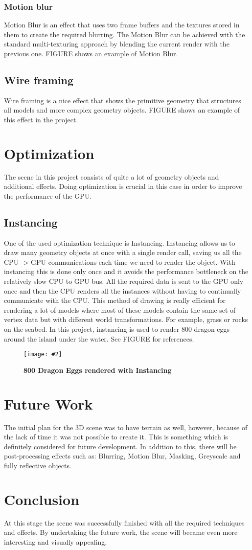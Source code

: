 \documentclass[10pt, a4paper]{article}
\newcommand{\figuremacro}[5]{
    \begin{figure}[#1]
        \centering
        \texttt{[image: \#2]}
        \caption[#3]{\textbf{#3}#4}
        \label{fig:#2}
    \end{figure}
}
\begin{document}
	\subsubsection{Motion blur}
	Motion Blur is an effect that uses two frame buffers and the textures stored in them to create the required blurring. The Motion Blur can be achieved with the standard multi-texturing approach by blending the current render with the previous one. FIGURE shows an example of Motion Blur.
	\subsection{Wire framing}
	Wire framing is a nice effect that shows the primitive geometry that structures all models and more complex geometry objects. FIGURE shows an example of this effect in the project.
	\section{Optimization}
	The scene in this project consists of quite a lot of geometry objects and additional effects. Doing optimization is crucial in this case in order to improve the performance of the GPU.
	\subsection{Instancing}
	One of the used optimization technique is Instancing. Instancing  allows us to draw many geometry objects at once with a single render call, saving us all the CPU -> GPU communications each time we need to render the object. With instancing this is done only once and it avoids the performance bottleneck on the relatively slow CPU to GPU bus. All the required data is sent to the GPU only once and then the CPU renders all the instances without having to continually communicate with the CPU. This method of drawing is really efficient for rendering a lot of models where most of these models contain the same set of vertex data but with different world transformations. For example, grass or rocks on the seabed. In this project, instancing is used to render 800 dragon eggs around the island under the water. See FIGURE for references.
	\figuremacro{h}{instancing}{800 Dragon Eggs rendered with Instancing}{ }{1.0}
	\section{Future Work}
	The initial plan for the 3D scene was to have terrain as well, however, because of the lack of time it was not possible to create it. This is something which is definitely considered  for future development. In addition to this, there will be post-processing effects such as: Blurring, Motion Blur, Masking, Greyscale and fully reflective objects. 
	\section{Conclusion}
	At this stage the scene was successfully finished with all the required techniques and effects. By undertaking the future work, the scene will became even more interesting and visually appealing.	


		
\end{document}
